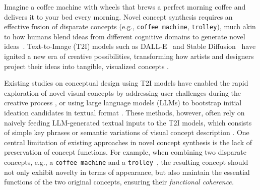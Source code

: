 Imagine a coffee machine with wheels that brews a perfect morning coffee and delivers it to your bed every morning. 
Novel concept synthesis requires an effective fusion of disparate concepts (e.g., \texttt{coffee machine}, \texttt{trolley}), much akin to how humans blend ideas from different cognitive domains to generate novel ideas~\cite{fauconnier2002wwt, Han2018THECD}. 
Text-to-Image (T2I) models such as DALL-E~\citep{dalle} and Stable Diffusion~\citep{stabled} have ignited a new era of creative possibilities, transforming how artists and designers project their ideas into tangible, visualized concepts \citep{wang2024diffusion, boutin2023diffusion, vinker2023concept, richardson2024conceptlab, rahman2024visual, kwon2024concept, wang2024divide}. 

Existing studies on conceptual design using T2I models have enabled the rapid exploration  of novel visual concepts \citep{wang2024inspired, cai2023designaid, ma2023conceptual} by addressing user challenges during the creative process \citep{wang2024inspired}, or using large language models (LLMs) to bootstrap initial ideation candidates in textual format \citep{cai2023designaid, zhu2023generative}. These methods, however, often rely on naively feeding LLM-generated textual inputs to the T2I models, which consists of simple key phrases or semantic variations of visual concept description \citep{cai2023designaid, wang2024inspired}. One central limitation of existing approaches in novel concept synthesis is the lack of preservation of concept functions. For example, when combining two disparate concepts, e.g., a \texttt{coffee machine} and a \texttt{trolley}~\cite{liew2022magicmix}, the resulting concept should not only exhibit novelty in terms of appearance, but also maintain the essential functions of the two original concepts, ensuring their \textit{functional coherence.}

